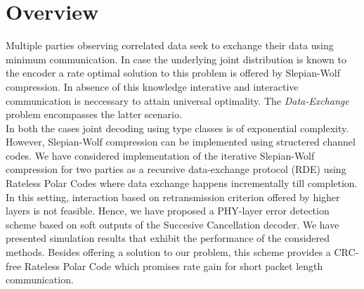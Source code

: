 \documentclass[
11pt, %
a4paper, %
oneside, %
headinclude,footinclude, %
BCOR5mm, %
]{scrartcl}
\begin{document}
\section*{Overview}
Multiple parties observing correlated data seek to exchange their data using minimum communication. In case the underlying joint distribution is known to the encoder a rate optimal solution to this problem is offered by Slepian-Wolf compression. In absence of this knowledge interative and interactive communication is neccessary to attain universal optimality. The \emph{Data-Exchange} problem  encompasses the latter scenario. \\In both the cases joint decoding using type classes is of exponential complexity. However, Slepian-Wolf compression can be implemented using structered channel codes. We have considered implementation of the iterative Slepian-Wolf compression for two parties as a recursive data-exchange protocol (RDE)  using Rateless Polar Codes where data exchange happens incrementally till completion. \\In this setting, interaction based on retransmission criterion offered by higher layers is not feasible.
Hence, we have  proposed a PHY-layer error detection scheme based on soft outputs of the Succesive Cancellation decoder. We have presented simulation results that exhibit the performance of the considered methods.
Besides offering a solution to our problem, this scheme provides a CRC-free Rateless Polar Code which promises rate gain for short packet length communication.

\newpage
\end{document}
